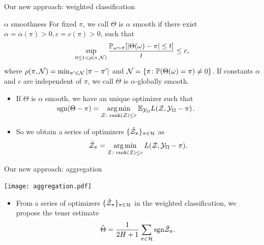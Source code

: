 \documentclass[10pt, mathserif]{beamer} %
\theoremstyle{definition}
\theoremstyle{plain}
\begin{document}
\begin{frame}{Our new approach: weighted classification}
\begin{block}{$\alpha$ smoothness}
For fixed $\pi$, we call $\Theta$ is $\alpha$ smooth if there exist $\alpha = \alpha(\pi)>0,c = c(\pi)>0$, such that 
\begin{align}
    \sup_{0\leq t<\rho(\pi,\mathcal{N})}{\mathbb{P}_{\omega\sim\pi}[|\Theta(\omega)-\pi|\leq t]\over t}\leq c,
\end{align}
where $\rho(\pi,\mathcal{N}) = \min_{\pi'\in\mathcal{N}}|\pi-\pi'|$ and $\mathcal{N} = \{\pi\colon\mathbb{P}(\Theta(\omega) = \pi)\neq 0\}$.
If constants $\alpha$ and $c$ are independent of $\pi$, we call $\Theta$ is $\alpha$-globally smooth.
\end{block}
    \begin{itemize}
    \item If $\Theta$ is $\alpha$ smooth, we have {\color{red}an unique optimizer}  such that\\[.1cm]
       $\hspace{2cm}\text{sgn}(\Theta-\pi) = \operatorname*{arg\,min}\limits_{\mathcal{Z}\colon \text{rank}(\mathcal{Z})\leq r} \mathbb{E}_{\mathcal{Y}_\Omega}L(\mathcal{Z},\mathcal{Y}_\Omega-\pi)$.\vspace*{.1cm}

    \item So we obtain a series of optimizers $\{\hat {\mathcal{Z}}_\pi\}_{\pi\in\mathcal{H}}$ as
    \begin{align}
        \hat {\mathcal{Z}}_\pi = \operatorname*{arg\,min}_{\mathcal{Z}\colon \text{rank}(\mathcal{Z})\leq r}L(\mathcal{Z},\mathcal{Y}_\Omega-\pi).
    \end{align}
    \end{itemize}
\end{frame}


\begin{frame}{Our new approach: aggregation}
    \begin{center}
    \texttt{[image: aggregation.pdf]}
    \end{center}
    \begin{itemize}
    \item From a series of optimizers $\{\hat{\mathcal{Z}}_\pi\}_{\pi\in\mathcal{H}}$ in the weighted classification, we propose the tensr estimate 
    \begin{align}
        \hat\Theta = {1\over 2H+1}\sum_{\pi\in\mathcal{H}}\text{sgn}\hat {\mathcal{Z}}_\pi.
    \end{align}
    \end{itemize}
\end{frame}
\end{document}
